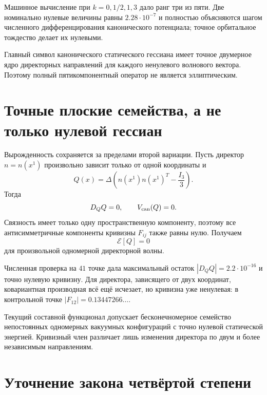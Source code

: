 Машинное вычисление при $k=0,1/2,1,3$ дало ранг три из пяти. Две
номинально нулевые величины равны $2.28\cdot10^{-7}$ и полностью
объясняются шагом численного дифференцирования канонического потенциала;
точное орбитальное тождество делает их нулевыми.

\begin{theorem}
Главный символ канонического статического гессиана имеет точное
двумерное ядро директорных направлений для каждого ненулевого волнового
вектора. Поэтому полный пятикомпонентный оператор не является
эллиптическим.
\end{theorem}

\section{Точные плоские семейства, а не только нулевой гессиан}

Вырожденность сохраняется за пределами второй вариации. Пусть директор
$n=n(x^1)$ произвольно зависит только от одной координаты и
\begin{equation}
 Q(x)=\Delta\left(n(x^1)n(x^1)^T-\frac{I_3}{3}\right).
\end{equation}
Тогда
\begin{equation}
 D_QQ=0,
 \qquad V_{\rm can}(Q)=0.
\end{equation}
Связность имеет только одну пространственную компоненту, поэтому все
антисимметричные компоненты кривизны $F_{ij}$ также равны нулю. Получаем
\begin{equation}
 \mathcal E[Q]=0
 \label{eq:v6-exact-flat-director-family}
\end{equation}
для произвольной одномерной директорной волны.

Численная проверка на $41$ точке дала максимальный остаток
$|D_QQ|=2.2\cdot10^{-16}$ и точно нулевую кривизну. Для директора,
зависящего от двух координат, ковариантная производная всё ещё исчезает,
но кривизна уже ненулевая: в контрольной точке
$|F_{12}|=0.13447266\ldots$.

\begin{proposition}
Текущий составной функционал допускает бесконечномерное семейство
непостоянных одномерных вакуумных конфигураций с точно нулевой статической
энергией. Кривизный член различает лишь изменения директора по двум и более
независимым направлениям.
\end{proposition}

\section{Уточнение закона четвёртой степени}

